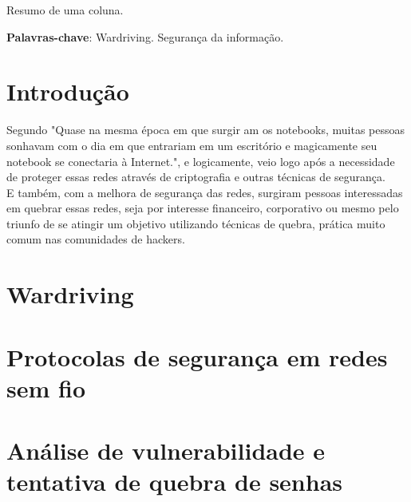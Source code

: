 \documentclass[
	article,			%
	12pt,				%
	oneside,			%
	a4paper,			%
	english,			%
	brazil,				%
	sumario=tradicional
	]{abntex2}
\begin{document}

\frenchspacing

\maketitle

\begin{resumoumacoluna}
 Resumo de uma coluna.

 \vspace{\onelineskip}

 \noindent
 \textbf{Palavras-chave}: Wardriving. Segurança da informação.
\end{resumoumacoluna}

\textual

\section*{Introdução}
\nocite{varredura-ibirama}
\nocite{analise-vulnerabilidade}

Segundo \cite[p. 67]{redes-tanenbaum} "Quase na mesma época em que surgir am os notebooks, muitas pessoas sonhavam com o dia em que entrariam em um escritório e magicamente seu notebook se conectaria à Internet.", e logicamente, veio logo após a necessidade de proteger essas redes através de criptografia e outras técnicas de segurança.\\

E também, com a melhora de segurança das redes, surgiram pessoas interessadas em quebrar essas redes, seja por interesse financeiro, corporativo ou mesmo pelo triunfo de se atingir um objetivo utilizando técnicas de quebra, prática muito comum nas comunidades de hackers.

\section{Wardriving}


\section{Protocolas de segurança em redes sem fio}

\section{Análise de vulnerabilidade e tentativa de quebra de senhas}
\end{document}
